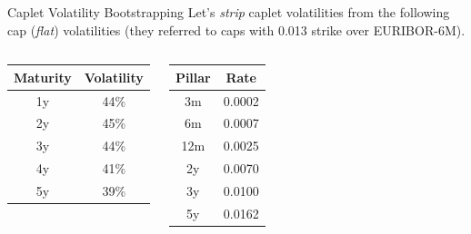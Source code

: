 \documentclass{beamer}
\begin{document}
\begin{frame}{Caplet Volatility Bootstrapping }
	Let's \emph{strip} caplet volatilities from the following cap (\emph{flat}) volatilities (they referred to caps with 0.013 strike over EURIBOR-6M).
	\begin{columns}
		\begin{center}
			\begin{tabular}{|c|c|}
				\hline
				Maturity & Volatility \\
				\hline
				1y & 44\% \\
				\hline
				2y & 45\% \\
				\hline
				3y & 44\% \\
				\hline
				4y & 41\% \\
				\hline
				5y & 39\% \\
				\hline
			\end{tabular}
		\end{center}
		\begin{center}
			\begin{tabular}{|c|c|}
				\hline
				Pillar & Rate \\
				\hline
				3m & 0.0002 \\
				\hline
				6m & 0.0007 \\
				\hline
				12m & 0.0025 \\
				\hline
				2y & 0.0070 \\
				\hline
				3y & 0.0100 \\
				\hline
				5y & 0.0162 \\
				\hline
			\end{tabular}
		\end{center}
	\end{columns}
\end{frame}
\end{document}
